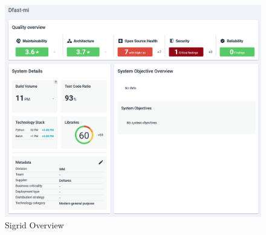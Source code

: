 \begin{figure}
\center
\includegraphics[width=\textwidth]{figures/sigrid.png}
\caption{Sigrid Overview}
\label{fig:sigrid_overview}
\end{figure}
